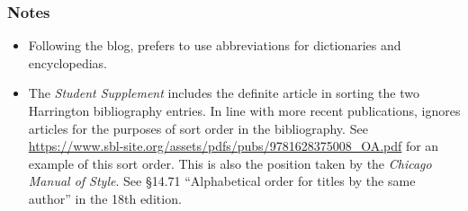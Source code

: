\documentclass[a4paper]{article}
\begin{document}
\begin{verbcite}
  \nocite{NIDNTT, dahood:1965-1970, harrington:1986, harrington:1970, Jastrow,
    DMBI, mclay:2006, oday:intertextuality, rad:1990}
\end{verbcite}
\exampleabbreviations
\examplebibliography

\subsubsection{Notes}

\begin{itemize}
  \item Following the blog,  prefers to use abbreviations
    for dictionaries and encyclopedias.
  \item The \emph{Student Supplement} includes the definite article in sorting
    the two Harrington bibliography entries. In line with more recent
    publications,  ignores articles for the purposes of
    sort order in the bibliography. See
    \url{https://www.sbl-site.org/assets/pdfs/pubs/9781628375008_OA.pdf} for
    an example of this sort order. This is also the position taken by the
    \emph{Chicago Manual of Style}. See §14.71 “Alphabetical order for titles
    by the same author” in the 18th edition.
\end{itemize}
\end{document}
